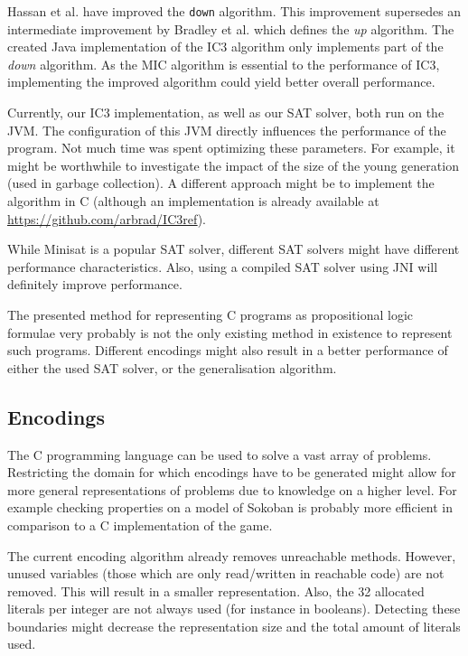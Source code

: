 \documentclass[a4paper]{article}
\begin{document}
Hassan et al. \cite{Hassan2013} have improved the \texttt{down} algorithm. This improvement supersedes an intermediate improvement by Bradley et al. \cite{Bradley2007} which defines the \emph{up} algorithm. The created Java implementation of the IC3 algorithm only implements part of the \emph{down} algorithm. As the MIC algorithm is essential to the performance of IC3, implementing the improved algorithm could yield better overall performance.

Currently, our IC3 implementation, as well as our SAT solver, both run on the JVM. The configuration of this JVM directly influences the performance of the program. Not much time was spent optimizing these parameters. For example, it might be worthwhile to investigate the impact of the size of the young generation (used in garbage collection). A different approach might be to implement the algorithm in C (although an implementation is already available at \url{https://github.com/arbrad/IC3ref}).

While Minisat is a popular SAT solver, different SAT solvers might have different performance characteristics. Also, using a compiled SAT solver using JNI will definitely improve performance.

The presented method for representing C programs as propositional logic formulae very probably is not the only existing method in existence to represent such programs. Different encodings might also result in a better performance of either the used SAT solver, or the generalisation algorithm.

\subsection{Encodings}
The C programming language can be used to solve a vast array of problems. %
Restricting the domain for which encodings have to be generated might allow for more general representations of problems due to knowledge on a higher level. For example checking properties on a model of Sokoban is probably more efficient in comparison to a C implementation of the game.

The current encoding algorithm already removes unreachable methods. However, unused variables (those which are only read/written in reachable code) are not removed. This will result in a smaller representation. Also, the 32 allocated literals per integer are not always used (for instance in booleans). Detecting these boundaries might decrease the representation size and the total amount of literals used.
\end{document}
